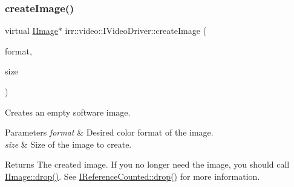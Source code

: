 \subsubsection{\texorpdfstring{create\+Image()}{createImage()}\hspace{0.1cm}{\footnotesize\ttfamily [1/8]}}
{\footnotesize\ttfamily virtual \hyperlink{classirr_1_1video_1_1IImage}{I\+Image}$\ast$ irr\+::video\+::\+I\+Video\+Driver\+::create\+Image (\begin{DoxyParamCaption}\item[{\hyperlink{namespaceirr_1_1video_a1d5e487888c32b1674a8f75116d829ed}{E\+C\+O\+L\+O\+R\+\_\+\+F\+O\+R\+M\+AT}}]{format,  }\item[{const \hyperlink{classirr_1_1core_1_1dimension2d}{core\+::dimension2d}$<$ \hyperlink{namespaceirr_a0416a53257075833e7002efd0a18e804}{u32} $>$ \&}]{size }\end{DoxyParamCaption})\hspace{0.3cm}{\ttfamily [pure virtual]}}



Creates an empty software image. 


\begin{DoxyParams}{Parameters}
{\em format} & Desired color format of the image. \\
\hline
{\em size} & Size of the image to create. \\
\hline
\end{DoxyParams}
\begin{DoxyReturn}{Returns}
The created image. If you no longer need the image, you should call \hyperlink{classirr_1_1IReferenceCounted_a03856a09355b89d178090c4a5f738543}{I\+Image\+::drop()}. See \hyperlink{classirr_1_1IReferenceCounted_a03856a09355b89d178090c4a5f738543}{I\+Reference\+Counted\+::drop()} for more information. 
\end{DoxyReturn}
\mbox{\label{classirr_1_1video_1_1IVideoDriver_aee1578fdd92118665755f31c0dd1dbb5}} 
